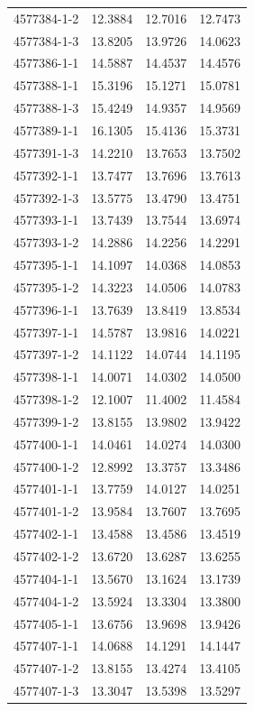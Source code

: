 \begin{longtable}{lrrr}
4577384-1-2 & 12.3884 & 12.7016 & 12.7473 \\
4577384-1-3 & 13.8205 & 13.9726 & 14.0623 \\
4577386-1-1 & 14.5887 & 14.4537 & 14.4576 \\
4577388-1-1 & 15.3196 & 15.1271 & 15.0781 \\
4577388-1-3 & 15.4249 & 14.9357 & 14.9569 \\
4577389-1-1 & 16.1305 & 15.4136 & 15.3731 \\
4577391-1-3 & 14.2210 & 13.7653 & 13.7502 \\
4577392-1-1 & 13.7477 & 13.7696 & 13.7613 \\
4577392-1-3 & 13.5775 & 13.4790 & 13.4751 \\
4577393-1-1 & 13.7439 & 13.7544 & 13.6974 \\
4577393-1-2 & 14.2886 & 14.2256 & 14.2291 \\
4577395-1-1 & 14.1097 & 14.0368 & 14.0853 \\
4577395-1-2 & 14.3223 & 14.0506 & 14.0783 \\
4577396-1-1 & 13.7639 & 13.8419 & 13.8534 \\
4577397-1-1 & 14.5787 & 13.9816 & 14.0221 \\
4577397-1-2 & 14.1122 & 14.0744 & 14.1195 \\
4577398-1-1 & 14.0071 & 14.0302 & 14.0500 \\
4577398-1-2 & 12.1007 & 11.4002 & 11.4584 \\
4577399-1-2 & 13.8155 & 13.9802 & 13.9422 \\
4577400-1-1 & 14.0461 & 14.0274 & 14.0300 \\
4577400-1-2 & 12.8992 & 13.3757 & 13.3486 \\
4577401-1-1 & 13.7759 & 14.0127 & 14.0251 \\
4577401-1-2 & 13.9584 & 13.7607 & 13.7695 \\
4577402-1-1 & 13.4588 & 13.4586 & 13.4519 \\
4577402-1-2 & 13.6720 & 13.6287 & 13.6255 \\
4577404-1-1 & 13.5670 & 13.1624 & 13.1739 \\
4577404-1-2 & 13.5924 & 13.3304 & 13.3800 \\
4577405-1-1 & 13.6756 & 13.9698 & 13.9426 \\
4577407-1-1 & 14.0688 & 14.1291 & 14.1447 \\
4577407-1-2 & 13.8155 & 13.4274 & 13.4105 \\
4577407-1-3 & 13.3047 & 13.5398 & 13.5297 \\

\end{longtable}
